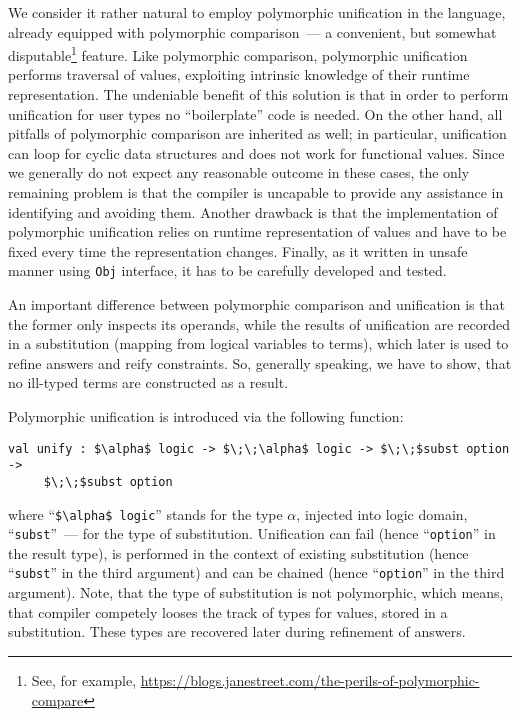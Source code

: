 \documentclass[10pt, oneside, nocopyrightspace]{sigplanconf}
\begin{document}
We consider it rather natural to employ polymorphic unification in the
language, already equipped with polymorphic comparison~--- a convenient, but
somewhat disputable\footnote{See, for example, \url{https://blogs.janestreet.com/the-perils-of-polymorphic-compare}} 
feature. Like polymorphic comparison, polymorphic unification performs traversal
of values, exploiting intrinsic knowledge of their runtime representation. 
The undeniable benefit of this solution is that in order to perform unification 
for user types no ``boilerplate'' code is needed. On the other hand, all pitfalls of
polymorphic comparison are inherited as well; in particular, unification can loop 
for cyclic data structures and does not work for functional values. Since we generally 
do not expect any reasonable outcome in these cases, the only remaining problem is that
the compiler is uncapable to provide any assistance in identifying 
and avoiding them. Another drawback is that the implementation of polymorphic unification
relies on runtime representation of values and have to be fixed every time the representation changes. 
Finally, as it written in unsafe manner using \lstinline{Obj} interface, it has to be
carefully developed and tested.

An important difference between polymorphic comparison and unification is that the former 
only inspects its operands, while the results of unification are recorded in a substitution
(mapping from logical variables to terms), which later is used to refine answers and reify 
constraints. So, generally speaking, we have to show, that no ill-typed terms are constructed 
as a result.

Polymorphic unification is introduced via the following function:

\begin{lstlisting}[mathescape=true]
   val unify : $\alpha$ logic -> $\;\;\alpha$ logic -> $\;\;$subst option -> 
     $\;\;$subst option
\end{lstlisting}

\noindent where ``\lstinline[mathescape=true]{$\alpha$ logic}'' stands for the type $\alpha$, 
injected into logic domain, ``\lstinline{subst}''~--- for the type of substitution. Unification can 
fail (hence ``\lstinline{option}'' in the result type), is performed in the context of
existing substitution (hence ``\lstinline{subst}'' in the third argument) and
can be chained (hence ``\lstinline{option}'' in the third argument). Note, that the 
type of substitution is not polymorphic, which means, that compiler competely looses the 
track of types for values, stored in a substitution. These types are recovered later during
refinement of answers.
\end{document}
